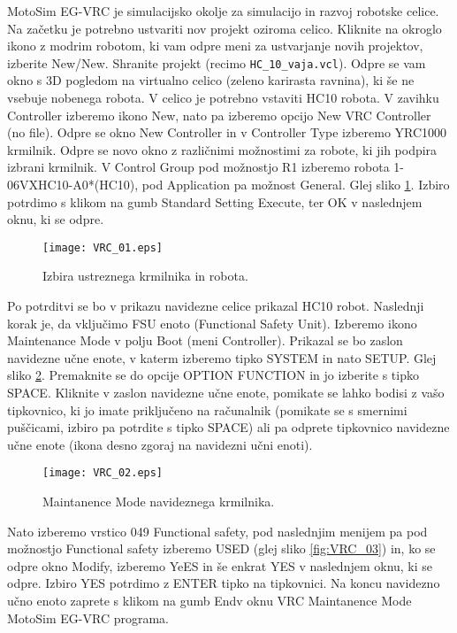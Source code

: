 MotoSim EG-VRC je simulacijsko okolje za simulacijo in razvoj robotske celice. Na začetku je potrebno ustvariti nov projekt oziroma celico. Kliknite na okroglo ikono z modrim robotom, ki vam odpre meni za ustvarjanje novih projektov, izberite New/New. Shranite projekt (recimo \verb|HC_10_vaja.vcl|). Odpre se vam okno s 3D pogledom na virtualno celico (zeleno karirasta ravnina), ki še ne vsebuje nobenega robota. V celico je potrebno vstaviti HC10 robota. V zavihku Controller izberemo ikono New, nato pa izberemo opcijo New VRC Controller (no file). Odpre se okno New Controller in v Controller Type izberemo YRC1000 krmilnik. Odpre se novo okno z različnimi možnostimi za robote, ki jih podpira izbrani krmilnik. V Control Group pod možnostjo R1 izberemo robota 1-06VXHC10-A0*(HC10), pod Application pa možnost General. Glej sliko \ref{fig:VRC_01}. Izbiro potrdimo s klikom na gumb Standard Setting Execute, ter OK v naslednjem oknu, ki se odpre.

\begin{figure}[hbt]
	\centering
	\texttt{[image: VRC\_01.eps]}
	\caption{Izbira ustreznega krmilnika in robota.}
	\label{fig:VRC_01}
\end{figure}

Po potrditvi se bo v prikazu navidezne celice prikazal HC10 robot. Naslednji korak je, da vključimo FSU enoto (Functional Safety Unit). Izberemo ikono Maintenance Mode v polju Boot (meni Controller). Prikazal se bo zaslon navidezne učne enote, v katerm izberemo tipko SYSTEM in nato SETUP. Glej sliko \ref{fig:VRC_02}. Premaknite se do opcije OPTION FUNCTION in jo izberite s tipko SPACE. Kliknite v zaslon navidezne učne enote, pomikate se lahko bodisi z vašo tipkovnico, ki jo imate priključeno na računalnik (pomikate se s smernimi puščicami, izbiro pa potrdite s tipko SPACE) ali pa odprete tipkovnico navidezne učne enote (ikona desno zgoraj na navidezni učni enoti).

\begin{figure}[hbt]
	\centering
	\texttt{[image: VRC\_02.eps]}
	\caption{Maintanence Mode navideznega krmilnika.}
	\label{fig:VRC_02}
\end{figure}

Nato izberemo vrstico 049 Functional safety, pod naslednjim menijem pa pod možnostjo Functional safety izberemo USED (glej sliko \ref{fig:VRC_03}) in, ko se odpre okno Modify, izberemo YeES in še enkrat YES v naslednjem oknu, ki se odpre. Izbiro YES potrdimo z ENTER tipko na tipkovnici. Na koncu navidezno učno enoto zaprete s klikom na gumb Endv oknu VRC Maintanence Mode MotoSim EG-VRC programa.

